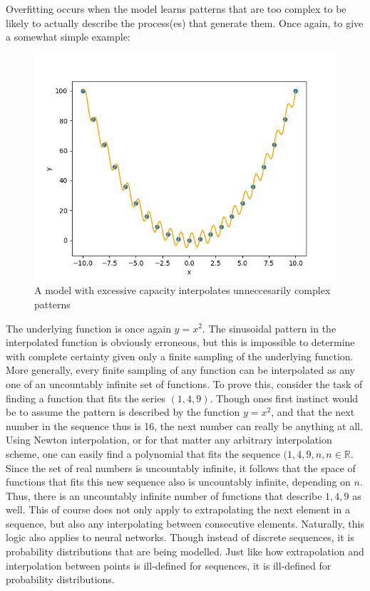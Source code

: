 		Overfitting occurs when the model learns patterns that are too complex to be likely to actually describe the process(es) that generate them. Once again, to give a somewhat simple example: 
		\begin{figure}[h]
			\includegraphics[width=\linewidth]{illustrations/overfit.png}
			\caption{A model with excessive capacity interpolates unneccesarily complex patterns}
			\label{Overfit example}
		\end{figure}
		The underlying function is once again \(y=x^2\). The sinusoidal pattern in the interpolated function is obviously erroneous, but this is impossible to determine with complete certainty given only a finite sampling of the underlying function. More generally, every finite sampling of any function can be interpolated as any one of an uncountably infinite set of functions. To prove this, consider the task of finding a function that fits the series \((1,4,9)\). Though ones first instinct would be to assume the pattern is described by the function \(y=x^2\), and that the next number in the sequence thus is 16, the next number can really be anything at all. Using Newton interpolation, or for that matter any arbitrary interpolation scheme, one can easily find a polynomial that fits the sequence \((1,4,9,n, n \in \mathbb{R}\). Since the set of real numbers is uncountably infinite, it follows that the space of functions that fits this new sequence also is uncountably infinite, depending on \(n\). Thus, there is an uncountably infinite number of functions that describe \(1,4,9\) as well. This of course does not only apply to extrapolating the next element in a sequence, but also any interpolating between consecutive elements. 
		Naturally, this logic also applies to neural networks. Though instead of discrete sequences, it is probability distributions that are being modelled. Just like how extrapolation and interpolation between points is ill-defined for sequences, it is ill-defined for probability distributions.
		
